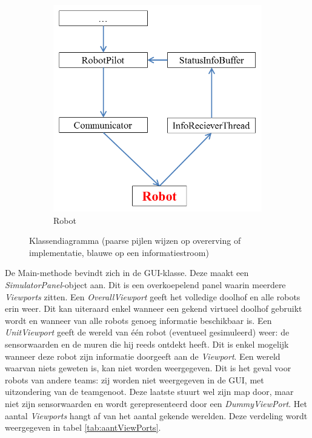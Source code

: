 \documentclass[tt1]{penoverslag}
\begin{document}
\begin{landscape}
\begin{figure}
\begin{subfigure}{0.45\textwidth}
		\includegraphics[width=\textwidth]{KlasRobot}
	\caption{Robot}
\end{subfigure}
\caption[Klassendiagramma]{Klassendiagramma (paarse pijlen wijzen op overerving of implementatie, blauwe op een informatiestroom)}
\label{fig:klasDia}
\end{figure}
\end{landscape}

De Main-methode bevindt zich in de GUI-klasse. Deze maakt een \textit{SimulatorPanel}-object aan. Dit is een overkoepelend panel waarin meerdere \textit{Viewports} zitten. Een \textit{OverallViewport} geeft het volledige doolhof en alle robots erin weer. Dit kan uiteraard enkel wanneer een gekend virtueel doolhof gebruikt wordt en wanneer van alle robots genoeg informatie beschikbaar is. Een \textit{UnitViewport} geeft de wereld van \'e\'en robot (eventueel gesimuleerd) weer: de sensorwaarden en de muren die hij reeds ontdekt heeft. Dit is enkel mogelijk wanneer deze robot zijn informatie doorgeeft aan de \textit{Viewport}. Een wereld waarvan niets geweten is, kan niet worden weergegeven. Dit is het geval voor robots van andere teams: zij worden niet weergegeven in de GUI, met uitzondering van de teamgenoot. Deze laatste stuurt wel zijn map door, maar niet zijn sensorwaarden en wordt gerepresenteerd door een \textit{DummyViewPort}. Het aantal \textit{Viewports} hangt af van het aantal gekende werelden. Deze verdeling wordt weergegeven in tabel \ref{tab:aantViewPorts}.\\
\end{document}
